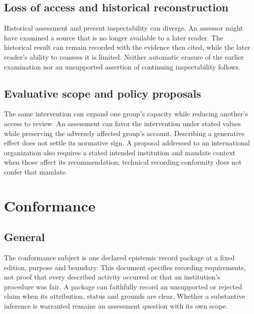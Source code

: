 \documentclass[11pt,a4paper]{article}
\begin{document}
\subsection{Loss of access and historical reconstruction}

Historical assessment and present inspectability can diverge. An assessor might have examined a source that is no longer available to a later reader. The historical result can remain recorded with the evidence then cited, while the later reader's ability to reassess it is limited. Neither automatic erasure of the earlier examination nor an unsupported assertion of continuing inspectability follows.

\subsection{Evaluative scope and policy proposals}

The same intervention can expand one group's capacity while reducing another's access to review. An assessment can favor the intervention under stated values while preserving the adversely affected group's account. Describing a generative effect does not settle its normative sign. A proposal addressed to an international organization also requires a stated intended institution and mandate context when those affect its recommendation; technical recording conformity does not confer that mandate.
\section{Conformance}
\subsection{General}
The conformance subject is one declared epistemic record package at a fixed edition, purpose and boundary. This document specifies recording requirements, not proof that every described activity occurred or that an institution's procedure was fair. A package can faithfully record an unsupported or rejected claim when its attribution, status and grounds are clear. Whether a substantive inference is warranted remains an assessment question with its own scope.
\end{document}
